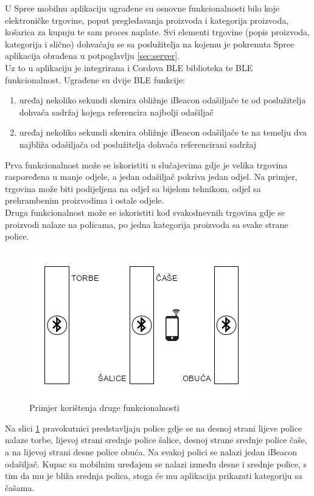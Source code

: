 U Spree mobilnu aplikaciju ugrađene su osnovne funkcionalnosti bilo koje elektroničke trgovine, poput pregledavanja proizvoda i kategorija proizvoda, košarica za kupnju te sam proces naplate. 
Svi elementi trgovine (popis proizvoda, kategorija i slično) dohvaćaju se sa poslužitelja na kojemu je pokrenuta Spree aplikacija obrađena u potpoglavlju \ref{sec:server}.
\\
Uz to u aplikaciju je integrirana i Cordova BLE biblioteka te BLE funkcionalnost.
Ugrađene su dvije BLE funkcije:
\begin{enumerate}
    \item uređaj nekoliko sekundi skenira obližnje iBeacon odašiljače te od poslužitelja dohvaća sadržaj kojega referencira najbolji odašiljač
    \item uređaj nekoliko sekundi skenira obližnje iBeacon odašiljače te na temelju dva najbliža odašiljača od poslužitelja dohvaća referencirani sadržaj 
\end{enumerate}

Prva funkcionalnost može se iskoristiti u slučajevima gdje je velika trgovina raspoređena u manje odjele, a jedan odašiljač pokriva jedan odjel. 
Na primjer, trgovina može biti podijeljena na odjel sa bijelom tehnikom, odjel sa prehrambenim proizvodima i ostale odjele. 
\\
Druga funkcionalnost može se iskoristiti kod svakodnevnih trgovina gdje se proizvodi nalaze na policama, po jedna kategorija proizvoda sa svake strane police.

\begin{figure}[H]
    \centering
    \includegraphics[scale=0.85]{pictures/BLE-funkcionalnost}
    \caption{Primjer korištenja druge funkcionalnosti}
    \label{pic:bleShop}
\end{figure}
Na slici \ref{pic:bleShop} pravokutnici predstavljaju police gdje se na desnoj strani lijeve police nalaze torbe, lijevoj strani srednje police šalice, desnoj strane srednje police čaše, a na lijevoj strani desne police obuća. 
Na svakoj polici se nalazi jedan iBeacon odašiljač. 
Kupac sa mobilnim uređajem se nalazi između desne i srednje police, s tim da mu je bliža srednja polica, stoga će mu aplikacija prikazati kategoriju sa čašama.
\\

